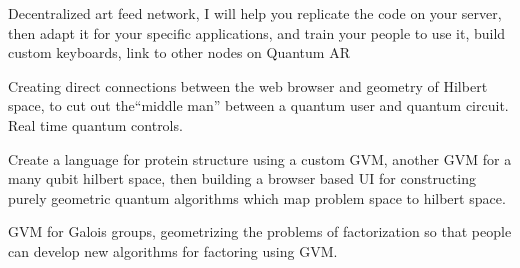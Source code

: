 \documentclass[11pt]{article}
\begin{document}
    Decentralized art feed network, I will help you replicate the code on your server, then adapt it for your specific applications, and train your people to use it, build custom keyboards, link to other nodes on Quantum AR





Creating direct connections between the web browser and geometry of Hilbert space, to cut out the``middle man'' between a quantum user and quantum circuit.  Real time quantum controls.    




    Create a language for protein structure using a custom GVM, another GVM for a many qubit hilbert space, then building a browser based UI for constructing purely geometric quantum algorithms which map problem space to hilbert space.  




    GVM for Galois groups, geometrizing the problems of factorization so that people can develop new algorithms for factoring using GVM.




    
\end{document}
